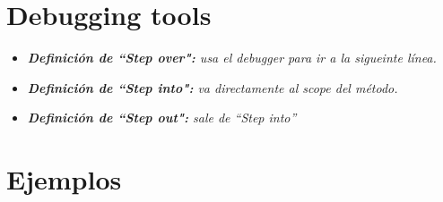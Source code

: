 \section{Debugging tools}
\begin{itemize}
    \item \emph{\textbf{Definición de ``Step over":} usa el debugger para ir a la sigueinte línea.}
    \item \emph{\textbf{Definición de ``Step into":} va directamente al scope del método.}
    \item \emph{\textbf{Definición de ``Step out":} sale de ``Step into''}
\end{itemize}


\section{Ejemplos}
